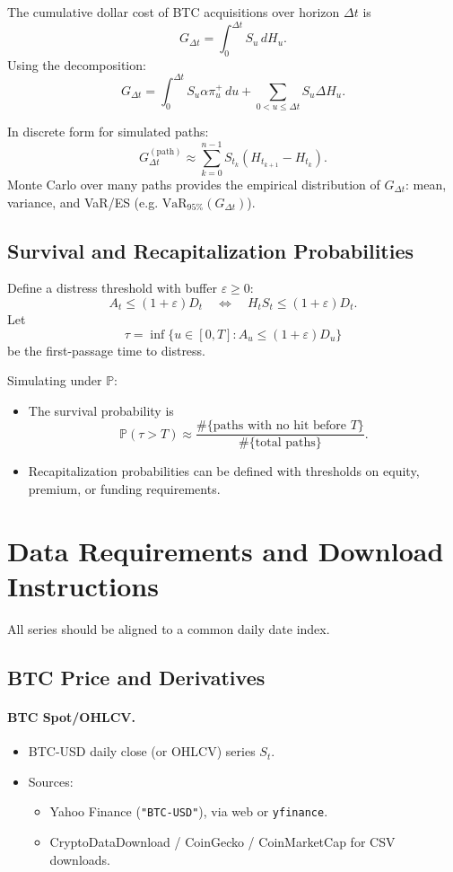 \documentclass[11pt]{article}
\begin{document}
The cumulative dollar cost of BTC acquisitions over horizon $\Delta t$ is
$$
  G_{\Delta t} = \int_0^{\Delta t} S_u\,dH_u.
$$
Using the decomposition:
$$
  G_{\Delta t}
  = \int_0^{\Delta t} S_u \alpha \pi_u^+\,du
    + \sum_{0 < u \le \Delta t} S_u \Delta H_u.
$$

In discrete form for simulated paths:
$$
  G_{\Delta t}^{(\text{path})}
  \approx \sum_{k=0}^{n-1} S_{t_k} (H_{t_{k+1}} - H_{t_k}).
$$
Monte Carlo over many paths provides the empirical distribution of $G_{\Delta t}$:
mean, variance, and VaR/ES (e.g. $\text{VaR}_{95\%}(G_{\Delta t})$).

\subsection{Survival and Recapitalization Probabilities}

Define a distress threshold with buffer $\varepsilon \ge 0$:
$$
  A_t \le (1+\varepsilon) D_t
  \quad \Longleftrightarrow \quad
  H_t S_t \le (1+\varepsilon) D_t.
$$
Let
$$
  \tau = \inf \{ u \in [0,T] : A_u \le (1+\varepsilon) D_u \}
$$
be the first-passage time to distress.

Simulating under $\mathbb P$:
\begin{itemize}
  \item The survival probability is
  $$
    \mathbb P(\tau > T) \approx 
    \frac{\#\{\text{paths with no hit before } T\}}{\#\{\text{total paths}\}}.
  $$
  \item Recapitalization probabilities can be defined with thresholds on equity, premium, or funding requirements.
\end{itemize}

\section{Data Requirements and Download Instructions}

All series should be aligned to a common daily date index.

\subsection{BTC Price and Derivatives}

\paragraph{BTC Spot/OHLCV.}
\begin{itemize}
  \item BTC-USD daily close (or OHLCV) series $S_t$.
  \item Sources:
  \begin{itemize}
    \item Yahoo Finance (\texttt{"BTC-USD"}), via web or \texttt{yfinance}.
    \item CryptoDataDownload / CoinGecko / CoinMarketCap for CSV downloads.
  \end{itemize}
\end{itemize}
\end{document}
